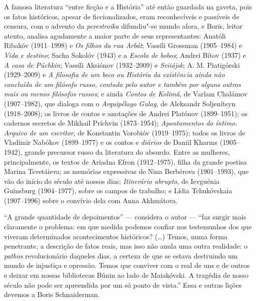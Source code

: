 A famosa literatura ``entre ficção e a História'' até então guardada na
gaveta, pois os fatos históricos, apesar de ficcionalizados, eram
reconhecíveis e passíveis de censura, com o advento da
\emph{perestroika} difundiu"-se mundo afora, e Boris, leitor atento,
analisa agudamente a maior parte de seus representantes: Anatóli Ribakóv
(1911--1998) e \emph{Os filhos da rua Arbát}; Vassíli Grossman
(1905--1984) e \emph{Vida e destino}; Sacha Sokolóv (1943) e a
\emph{Escola de bobos}; Andrei Bítov (1937) e \emph{A casa de Púchkin};
Vassíli Aksiónov (1932--2009) e \emph{Sviiájsk}; A. M. Piatigórski
(1929--2009) e \emph{A filosofia de um beco ou História da existência
ainda não concluída de um filósofo russo, contada pelo autor e também
por alguns outros mais ou menos filósofos russos}; e ainda
\emph{Contos de Kolimá}, de Varlam Chalámov (1907--1982), que dialoga com o \emph{Arquipélago Gulag}, de Aleksandr Soljenítsyn (1918--2008); os
livros de contos e anotações de Andrei Platónov (1899--1951); os cadernos
secretos de Mikhail Príchvin (1873--1954); \emph{Apontamentos do íntimo.
Arquivo de um escritor}, de Konstantin Vorobióv (1919--1975); todos os
livros de Vladímir Nabókov (1899--1977) e os contos e \emph{diários} de
Daniil Kharms (1905--1942), grande precursor russo da literatura do
absurdo. Entre as mulheres, principalmente, os textos de Ariadna Efron
(1912--1975), filha da grande poetisa Marina Tsvetáieva; as memórias
expressivas de Nina Berbérova (1901--1993), que vão do início do século
até nossos dias; \emph{Itinerário abrupto}, de Ievguénia Guinsburg
(1904--1977), sobre os campos de trabalho; e Lídia Tchukóvskaia
(1907--1996) sobre o convívio dela com Anna Akhmátova.

``A grande quantidade de depoimentos'' --- considera o autor --- ``faz
surgir mais claramente o problema: em que medida podemos confiar nos
testemunhos dos que viveram determinados acontecimentos históricos?
(\ldots{}) Temos, numa forma penetrante, a descrição de fatos reais, mas
isso não anula uma outra realidade: o \emph{pathos} revolucionário
daqueles dias, a certeza de que se estava destruindo um mundo de
injustiça e opressão. Temos que conviver com o real de uns e de outros e
deixar em nossas bibliotecas Búnin ao lado de Maiakóvski. A tragédia de
nosso século não pode ser apreendida por um só ponto de vista.'' Essa e
outras lições devemos a Boris Schnaiderman.

